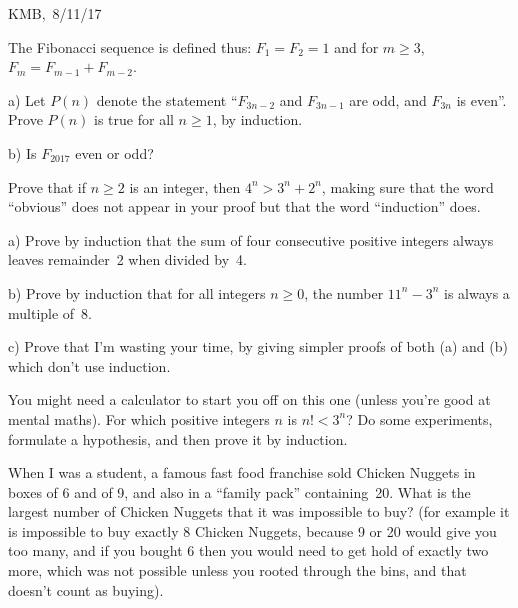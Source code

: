 \documentclass[10pt]{article}
\begin{document}
\begin{flushright} KMB,\ 8/11/17\end{flushright}


\medskip{} The Fibonacci sequence is defined thus: $F_1=F_2=1$ and for $m\geq3$, $F_m=F_{m-1}+F_{m-2}$. 

a) Let $P(n)$ denote the statement ``$F_{3n-2}$ and $F_{3n-1}$ are odd, and $F_{3n}$ is even''. Prove $P(n)$ is true for all $n\geq1$, by induction.

b) Is $F_{2017}$ even or odd?

\medskip{} Prove that if $n\geq2$ is an integer, then $4^n>3^n+2^n$, making sure that the word ``obvious'' does not appear in your proof but that the word ``induction'' does.

\medskip{} 

a) Prove by induction that the sum of four consecutive positive integers always leaves remainder~2 when divided by~4.

b) Prove by induction that for all integers $n\geq0$, the number $11^n-3^n$ is always a multiple of~8.

c) Prove that I'm wasting your time, by giving simpler proofs of both (a) and (b) which don't use induction.

\medskip{} You might need a calculator to start you off on this one (unless you're good at mental maths). For which positive integers $n$ is $n!<3^n$? Do some experiments, formulate a hypothesis, and then prove it by induction.

\medskip{} When I was a student, a famous fast food franchise sold Chicken Nuggets in boxes of 6 and of 9, and also in a ``family pack'' containing~20. What is the largest number of Chicken Nuggets that it was impossible to buy? (for example it is impossible to buy exactly 8 Chicken Nuggets, because 9 or 20 would give you too many, and if you bought 6 then you would need to get hold of exactly two more, which was not possible unless you rooted through the bins, and that doesn't count as buying). 
\end{document}
